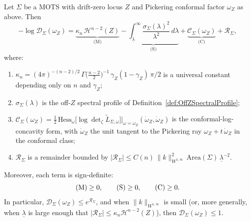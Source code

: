 \begin{theorem}\label{thm:RelativeDeterminantBridge}
Let $\Sigma$ be a MOTS with drift-zero locus $Z$ and Pickering conformal factor $\omega_Z$ as above. Then
\begin{equation}\label{eq:BridgeIdentity}
    -\log \mathscr D_\Sigma(\omega_Z)
    =
    \underbrace{\kappa_n\,\mathcal H^{n-2}(Z)}_{\text{(M)}}
    -
    \underbrace{\int_{\underline\lambda}^\infty\frac{\sigma_\Sigma(\lambda)^2}{\lambda^2}\,d\lambda}_{\text{(S)}}
    +
    \underbrace{\mathcal C_\Sigma(\omega_Z)}_{\text{(C)}}
    +\mathcal R_\Sigma,
\end{equation}
where:
\begin{enumerate}
    \item[\textup{(M)}] $\kappa_n=(4\pi)^{-(n-2)/2}\,\Gamma\bigl(\tfrac{n-2}{2}\bigr)^{-1}\,\gamma_Z(1-\gamma_Z)\,\pi/2$ is a universal constant depending only on $n$ and $\gamma_Z$;
    \item[\textup{(S)}] $\sigma_\Sigma(\lambda)$ is the off-$Z$ spectral profile of Definition~\ref{def:OffZSpectralProfile};
    \item[\textup{(C)}] $\mathcal C_\Sigma(\omega_Z)=\tfrac12\,\mathrm{Hess}_{\omega}\bigl[\log\det\nolimits_\zeta \tilde L_{\Sigma,\omega}\bigr]\big|_{\omega=\omega_Z}(\dot\omega_Z,\dot\omega_Z)$ is the conformal-log-concavity form, with $\dot\omega_Z$ the unit tangent to the Pickering ray $\omega_Z+t\,\dot\omega_Z$ in the conformal class;
    \item[\textup{(R)}] $\mathcal R_\Sigma$ is a remainder bounded by $|\mathcal R_\Sigma|\le C(n)\,\|k\|_{W^{1,\infty}}^2\,\mathrm{Area}(\Sigma)\,\underline\lambda^{-2}$.
\end{enumerate}
Moreover, each term is sign-definite:
\begin{equation}\label{eq:BridgeSigns}
    \textup{(M)}\ge0,
    \qquad
    \textup{(S)}\ge0,
    \qquad
    \textup{(C)}\ge0.
\end{equation}
In particular, $\mathscr D_\Sigma(\omega_Z)\le e^{\mathcal R_\Sigma}$, and when $\|k\|_{W^{1,\infty}}$ is small (or, more generally, when $\underline\lambda$ is large enough that $|\mathcal R_\Sigma|\le\kappa_n\mathcal H^{n-2}(Z)$), then $\mathscr D_\Sigma(\omega_Z)\le1$.
\end{theorem}

